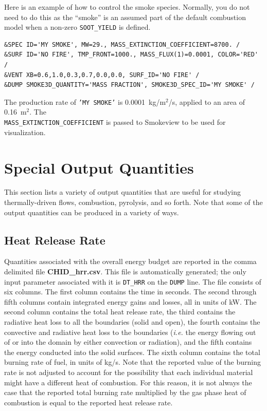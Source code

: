 \documentclass[11pt]{book}
\newcommand{\ct}{\tt\small}
\begin{document}
Here is an example of how to control the smoke species. Normally, you do not need to do this as the ``smoke'' is an assumed part of the default combustion model when a non-zero {\ct SOOT\_YIELD} is defined.

\footnotesize
\begin{verbatim}
&SPEC ID='MY SMOKE', MW=29., MASS_EXTINCTION_COEFFICIENT=8700. /
&SURF ID='NO FIRE', TMP_FRONT=1000., MASS_FLUX(1)=0.0001, COLOR='RED' /
&VENT XB=0.6,1.0,0.3,0.7,0.0,0.0, SURF_ID='NO FIRE' /
&DUMP SMOKE3D_QUANTITY='MASS FRACTION', SMOKE3D_SPEC_ID='MY SMOKE' /
\end{verbatim}

\normalsize
\noindent
The production rate of {\ct 'MY SMOKE'} is 0.0001~kg/m$^2$/s, applied to an area of 0.16~m$^2$. The \\ {\ct MASS\_EXTINCTION\_COEFFICIENT} is passed to
Smokeview to be used for visualization.






\clearpage

\section{Special Output Quantities}

This section lists a variety of output quantities that are useful for studying thermally-driven flows, combustion, pyrolysis, and so forth. Note that some
of the output quantities can be produced in a variety of ways.


\subsection{Heat Release Rate}
\label{info:HRR}

Quantities associated with the overall energy budget are reported in
the comma delimited file {\bf CHID\_hrr.csv}.  This file is
automatically generated; the only input parameter associated with it
is {\ct DT\_HRR} on the {\ct DUMP} line. The file consists of six
columns.  The first column contains the time in seconds. The second
through fifth columns contain integrated energy gains and losses, all
in units of kW. The second column contains the total heat release
rate, the third contains the radiative heat loss to all the boundaries
(solid and open), the fourth contains the convective and radiative
heat loss to the boundaries ({\em i.e.} the energy flowing out of or
into the domain by either convection or radiation), and the fifth contains the energy conducted into the
solid surfaces.  The sixth column contains the total burning rate of
fuel, in units of kg/s. Note that the reported value of the burning rate is not adjusted to account for the possibility that each individual
material might have a different heat of combustion. For this reason, it is not always the case that the reported total
burning rate multiplied by the gas phase heat of combustion is equal to the reported heat release rate.
\end{document}
